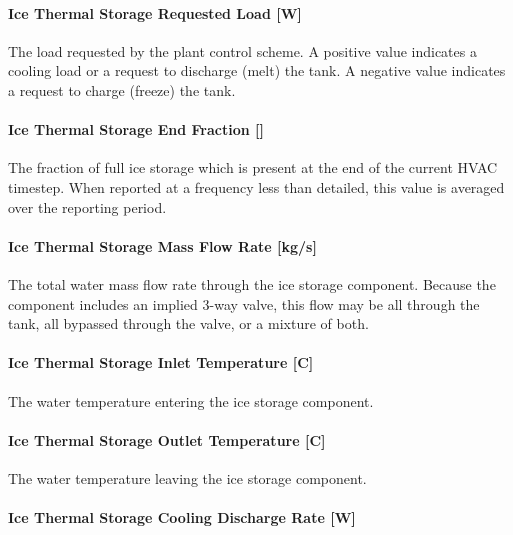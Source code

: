 \paragraph{Ice Thermal Storage Requested Load {[}W{]}}\label{ice-thermal-storage-requested-load-w}

The load requested by the plant control scheme. A positive value indicates a cooling load or a request to discharge (melt) the tank. A negative value indicates a request to charge (freeze) the tank.

\paragraph{Ice Thermal Storage End Fraction {[]}}\label{ice-thermal-storage-end-fraction}

The fraction of full ice storage which is present at the end of the current HVAC timestep. When reported at a frequency less than detailed, this value is averaged over the reporting period.

\paragraph{Ice Thermal Storage Mass Flow Rate {[}kg/s{]}}\label{ice-thermal-storage-mass-flow-rate-kgs}

The total water mass flow rate through the ice storage component. Because the component includes an implied 3-way valve, this flow may be all through the tank, all bypassed through the valve, or a mixture of both.

\paragraph{Ice Thermal Storage Inlet Temperature {[}C{]}}\label{ice-thermal-storage-inlet-temperature-c}

The water temperature entering the ice storage component.

\paragraph{Ice Thermal Storage Outlet Temperature {[}C{]}}\label{ice-thermal-storage-outlet-temperature-c}

The water temperature leaving the ice storage component.

\paragraph{Ice Thermal Storage Cooling Discharge Rate {[}W{]}}\label{ice-thermal-storage-cooling-discharge-rate-w}

